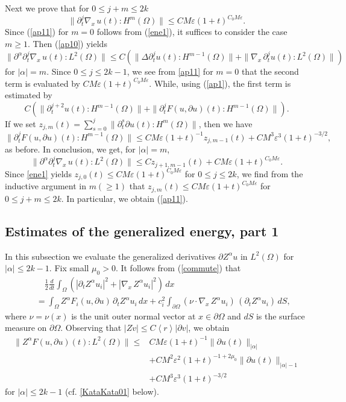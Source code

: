 \documentclass[12pt]{amsart}
\newcommand{\ve}{\varepsilon}
\newcommand{\pa}{\partial}
\newcommand{\jb}[1]{\left\langle #1 \right\rangle}
\numberwithin{equation}{section}
\begin{document}
Next we prove that for $0 \le j+m \le 2k$
\begin{equation}\label{ap11}
 \|\partial_t^{j} \nabla_{\!x}\, u(t)\!:\!{H^m(\Omega)}\|
 \le CM\ve (1+t)^{C_0 M\ve}.
\end{equation}
Since (\ref{ap11}) for $m=0$ follows from (\ref{ene1}), it suffices to consider the case $m \ge 1$. 
Then (\ref{ap10}) yields
\begin{equation}\nonumber
\|\pa^\alpha \partial_t^j \nabla_{\!x}\, u(t)\!:\!{L^2(\Omega)}\|
\le C( \|\Delta \partial_t^{j} u(t)\!:\!{{H}^{m-1}(\Omega) }\|
+\|\nabla_{\!x}\, \partial_t^{j} u(t)\!:\!{L^2(\Omega)}\|)
\end{equation}
for $|\alpha|=m$.
Since $0\le j \le 2k-1$, we see from %
\eqref{ap11} for $m=0$ that the second term
is evaluated by $CM\ve (1+t)^{C_0 M\ve}$.
While, using (\ref{ap1}), the first term is estimated by
$$
C( \|\partial_t^{j+2} u(t)\!:\!{{H}^{m-1}(\Omega) }\|
+\|\partial_t^{j} F(u,\pa u)(t)\!:\!{H^{m-1}(\Omega)}\|).
$$
If we set $z_{j,m}(t)= \sum_{s=0}^{j} \|\pa_t^{s} \pa u(t)\!:\!{H^m(\Omega)}\|$,
then we have
$$
\|\pa_t^{j} F(u, \pa u)(t)\!:\!{H^{m-1}(\Omega)}\| 
\le C M\ve (1+t)^{-1} z_{j,m-1}(t) +CM^3\ve^3(1+t)^{-3/2},
$$
as before. 
In conclusion, we get, for $|\alpha|=m$,
\begin{equation}\nonumber
 \|\pa^\alpha \partial_t^{j} \nabla_{\!x}\, u(t)\!:\!{L^2(\Omega)}\|
\le C z_{j+1,m-1}(t) +CM\ve (1+t)^{C_0 M\ve}.
\end{equation}
Since \eqref{ene1} yields $z_{j,0}(t)\le CM\ve (1+t)^{C_0M\ve}$
for $0\le j\le 2k$, we find from the inductive argument in $m(\ge 1)$
that $z_{j,m}(t)\le CM\ve (1+t)^{C_0M\ve}$
for $0\le j+m\le 2k$.
In particular, we obtain (\ref{ap11}).
\subsection{Estimates of the generalized energy, part 1}\label{KEE2}
In this subsection we evaluate the generalized derivatives $\pa Z^\alpha u$ in $L^2(\Omega)$
for $|\alpha| \le 2k-1$.
Fix small $\mu_0>0$.
It follows from (\ref{commute}) that
\begin{eqnarray}\label{ene2}
&& \quad \frac12\frac{d}{dt} 
 \int_{\Omega} \left(|\partial_t Z^\alpha u_i|^2+|\nabla_{\!x}\, Z^\alpha u_i|^2
  \right)\,dx
\\ \nonumber
&& =\int_{\Omega} Z^\alpha F_i(u,\partial u)\,\partial_t Z^\alpha u_i\,dx
 +c_i^2\int_{\partial \Omega} (\nu\cdot \nabla_{\!x}\, Z^\alpha u_i)\,(\partial_t
  Z^\alpha u_i)\,dS,
\end{eqnarray}
where $\nu=\nu(x)$ is the unit outer normal vector at $x \in \partial \Omega$
and $dS$ is the surface measure on $\partial \Omega$.
Observing that $|Z v|\le C \jb{r} |\pa v|$, we obtain
\begin{align}\label{ene3}
\|Z^{\alpha} F(u, \pa u)(t)\!:\!{L^2(\Omega)}\| 
\le & CM\ve (1+t)^{-1} \|\pa u(t)\|_{|\alpha|}\\
&+CM^2\ve^2(1+t)^{-1+2\mu_0}\|\pa u(t)\|_{|\alpha|-1}
\nonumber\\
&+CM^3\ve^3(1+t)^{-3/2}
\nonumber
\end{align}
for $|\alpha| \le 2k-1$ (cf. \eqref{KataKata01} below).
\end{document}
